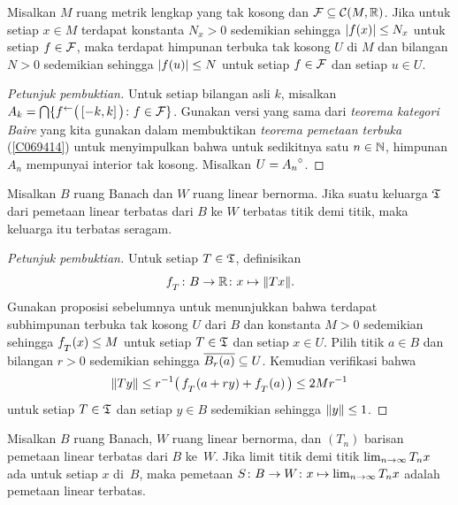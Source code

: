 \begin{prop}\label{C070117} Misalkan $M$ ruang metrik lengkap yang tak kosong dan $\mathcal{F} \subseteq \mathcal{C}(M,\mathbb{R})$.
Jika untuk setiap $x \in M$ terdapat konstanta $N_x > 0$ sedemikian sehingga $\lvert f(x)\rvert \le N_x$ untuk
setiap $f \in \mathcal{F}$, maka terdapat himpunan terbuka tak kosong $U$ di $M$ dan bilangan $N > 0$ sedemikian
sehingga $\lvert f(u)\rvert \le N$ untuk setiap $f \in \mathcal{F}$ dan setiap $u \in U$.
\end{prop}

\begin{proof}[\emph{Petunjuk pembuktian}] Untuk setiap bilangan asli $k$, misalkan $A_k =
\bigcap\{f^{\gets}\bigl(\,[-k,k]\,\bigr)\colon f \in \mathcal{F}\}$. Gunakan versi yang sama dari
\emph{teorema kategori Baire} yang kita gunakan dalam membuktikan \emph{teorema pemetaan terbuka} (\ref{C069414})
untuk menyimpulkan bahwa untuk sedikitnya satu $n \in \mathbb{N}$, himpunan $A_n$ mempunyai interior
tak kosong. Misalkan $U = {A_n}^{\circ}$.   \ns
\end{proof}

\begin{thm}\label{thm_PUB} Misalkan $B$ ruang Banach dan $W$ ruang linear bernorma.
Jika suatu keluarga $\mathfrak{T}$ dari pemetaan linear terbatas dari $B$ ke $W$ terbatas titik demi
titik, maka keluarga itu terbatas seragam.
\end{thm}

\begin{proof}[\emph{Petunjuk pembuktian}] Untuk setiap $T \in \mathfrak{T}$, definisikan
  \[ f_{{}_{\scriptstyle{T}}}\colon B \rightarrow \mathbb{R}\colon x \mapsto \lVert Tx\rVert. \]
Gunakan proposisi sebelumnya untuk menunjukkan bahwa terdapat subhimpunan terbuka tak kosong $U$ dari $B$
dan konstanta $M > 0$ sedemikian sehingga $f_{{}_{\scriptstyle{T}}}(x) \le M$ untuk setiap $T \in \mathfrak{T}$ dan setiap
$x \in U$. Pilih titik $a \in B$ dan bilangan $r > 0$ sedemikian sehingga $\overline{B_r(a)} \subseteq
U$. Kemudian verifikasi bahwa
  \[ \lVert Ty\rVert \le r^{-1}\bigl(\, f_{{}_{\scriptstyle{T}}}(a + ry) + f_{{}_{\scriptstyle{T}}}(a)\,\bigr) \le 2Mr^{-1} \]
untuk setiap $T \in \mathfrak{T}$ dan setiap $y \in B$ sedemikian sehingga $\lVert y\rVert \le 1$. \ns
\end{proof}

\begin{thm} Misalkan $B$ ruang Banach, $W$ ruang linear bernorma,
dan $(T_n)$ barisan pemetaan linear terbatas dari $B$ ke~$W$. Jika limit titik demi titik
$\lim_{n \rightarrow \infty} T_nx$ ada untuk setiap $x$ di~$B$, maka pemetaan $S\colon B \rightarrow
W\colon x \mapsto \lim_{n \rightarrow \infty} T_nx$ adalah pemetaan linear terbatas.
\end{thm}


